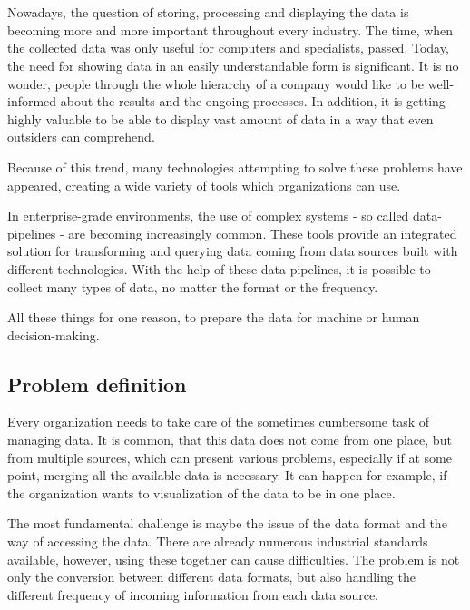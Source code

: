 \chapter{\bevezetes}


Nowadays, the question of storing, processing and displaying the data is becoming more and more important throughout every industry. The time, when the collected data was only useful for computers and specialists, passed. Today, the need for showing data in an easily understandable form is significant. It is no wonder, people through the whole hierarchy of a company would like to be well-informed about the results and the ongoing processes. In addition, it is getting highly valuable to be able to display vast amount of data in a way that even outsiders can comprehend.

Because of this trend, many technologies attempting to solve these problems have
appeared, creating a wide variety of tools which organizations can use.

In enterprise-grade environments, the use of complex systems - so called data-pipelines - are becoming increasingly common. These tools provide an integrated solution for transforming and querying data coming from data sources built with different technologies. With the help of these data-pipelines, it is possible to collect many types of data, no matter the format or the frequency.

All these things for one reason, to prepare the data for machine or human decision-making.

\section{Problem definition}\label{problem-definition}

Every organization needs to take care of the sometimes cumbersome task of managing data. It is common, that this data does not come from one place, but from multiple sources, which can present various problems, especially if at some point, merging all the available data is necessary. It can happen for example, if the organization wants to visualization of the data to be in one place.

The most fundamental challenge is maybe the issue of the data format and the way of accessing the data. There are already numerous industrial standards available, however, using these together can cause difficulties. The problem is not only the conversion between different data formats, but also handling the different frequency of incoming information from each data source.

